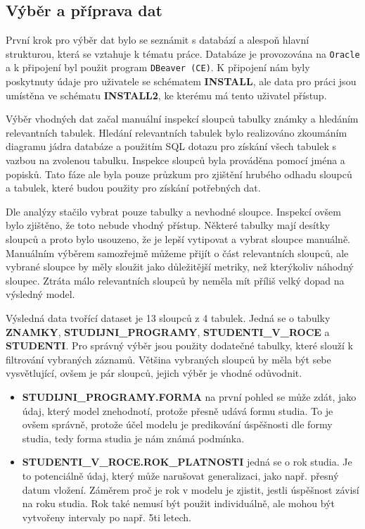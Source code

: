 \documentclass[12pt, letterpaper]{article}
\begin{document}
\subsection{Výběr a příprava dat}
První krok pro výběr dat bylo se seznámit s databází a alespoň hlavní strukturou, která se vztahuje k tématu práce.
Databáze je provozována na \texttt{Oracle} a k připojení byl použit program \texttt{DBeaver (CE)}. K připojení nám
byly poskytnuty údaje pro uživatele se schématem \textbf{INSTALL}, ale data pro práci jsou umístěna ve schématu
\textbf{INSTALL2}, ke kterému má tento uživatel přístup.

Výběr vhodných dat začal manuální inspekcí sloupců tabulky známky a hledáním relevantních tabulek. Hledání relevantních
tabulek bylo realizováno zkoumáním diagramu jádra databáze a použitím SQL dotazu pro získání všech tabulek s vazbou
na zvolenou tabulku. Inspekce sloupců byla prováděna pomocí jména a popisků. Tato fáze ale byla pouze průzkum pro 
zjištění hrubého odhadu sloupců a tabulek, které budou použity pro získání potřebných dat.

Dle analýzy stačilo vybrat pouze tabulky a  nevhodné sloupce. Inspekcí ovšem bylo zjištěno, že toto nebude
vhodný přístup. Některé tabulky mají desítky sloupců a proto bylo usouzeno, že je lepší vytipovat a vybrat sloupce 
manuálně. Manuálním výběrem samozřejmě můžeme přijít o část relevantních sloupců, ale vybrané sloupce by měly sloužit
jako důležitější metriky, než kterýkoliv náhodný sloupec. Ztráta málo relevantních sloupců by neměla mít příliš velký
dopad na výsledný model.

Výsledná data tvořící dataset je 13 sloupců z 4 tabulek. Jedná se o tabulky \textbf{ZNAMKY}, 
\textbf{STUDIJNI\_PROGRAMY}, \textbf{STUDENTI\_V\_ROCE} a \textbf{STUDENTI}. Pro správný výběr jsou použity dodatečné 
tabulky, které slouží k filtrování vybraných záznamů. Většina vybraných sloupců by měla být 
sebe vysvětlující, ovšem je pár sloupců, jejich výběr je vhodné odůvodnit.
%
\begin{itemize}
    \item \textbf{STUDIJNI\_PROGRAMY.FORMA} na první pohled se může zdát, jako údaj, který model znehodnotí, protože 
        přesně udává formu studia. To je ovšem správně, protože účel modelu je predikování úspěšnosti dle formy 
        studia, tedy forma studia je nám známá podmínka.
    \item \textbf{STUDENTI\_V\_ROCE.ROK\_PLATNOSTI} jedná se o rok studia. Je to potenciálně údaj, který může narušovat
        generalizaci, jako např. přesný datum vložení. Záměrem proč je rok v modelu je zjistit, jestli úspěšnost závisí
        na roku studia. Rok také nemusí být použit individuálně, ale mohou být vytvořeny intervaly po např. 5ti letech.
\end{itemize}
\end{document}
